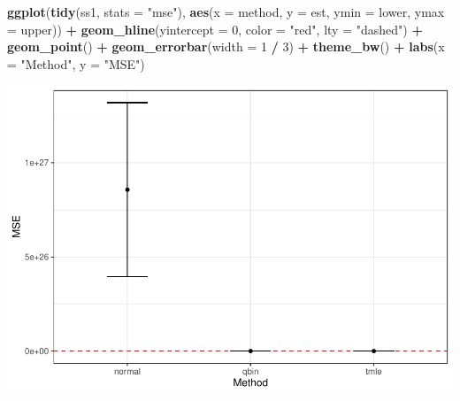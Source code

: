 \documentclass[
]{article}
\newenvironment{Shaded}{\begin{snugshade}}{\end{snugshade}}
\newcommand{\AttributeTok}[1]{\textcolor[rgb]{0.13,0.29,0.53}{#1}}
\newcommand{\DecValTok}[1]{\textcolor[rgb]{0.00,0.00,0.81}{#1}}
\newcommand{\FunctionTok}[1]{\textcolor[rgb]{0.13,0.29,0.53}{\textbf{#1}}}
\newcommand{\NormalTok}[1]{#1}
\newcommand{\SpecialCharTok}[1]{\textcolor[rgb]{0.81,0.36,0.00}{\textbf{#1}}}
\newcommand{\StringTok}[1]{\textcolor[rgb]{0.31,0.60,0.02}{#1}}
\begin{document}
\begin{Shaded}
\begin{Highlighting}[]
\FunctionTok{ggplot}\NormalTok{(}\FunctionTok{tidy}\NormalTok{(ss1, }\AttributeTok{stats =} \StringTok{"mse"}\NormalTok{), }\FunctionTok{aes}\NormalTok{(}\AttributeTok{x =}\NormalTok{ method, }\AttributeTok{y =}\NormalTok{ est, }\AttributeTok{ymin =}\NormalTok{ lower, }\AttributeTok{ymax =}\NormalTok{ upper)) }\SpecialCharTok{+}
  \FunctionTok{geom\_hline}\NormalTok{(}\AttributeTok{yintercept =} \DecValTok{0}\NormalTok{, }\AttributeTok{color =} \StringTok{"red"}\NormalTok{, }\AttributeTok{lty =} \StringTok{"dashed"}\NormalTok{) }\SpecialCharTok{+}
  \FunctionTok{geom\_point}\NormalTok{() }\SpecialCharTok{+}
  \FunctionTok{geom\_errorbar}\NormalTok{(}\AttributeTok{width =} \DecValTok{1} \SpecialCharTok{/} \DecValTok{3}\NormalTok{) }\SpecialCharTok{+}
  \FunctionTok{theme\_bw}\NormalTok{() }\SpecialCharTok{+}
  \FunctionTok{labs}\NormalTok{(}\AttributeTok{x =} \StringTok{"Method"}\NormalTok{, }\AttributeTok{y =} \StringTok{"MSE"}\NormalTok{)}
\end{Highlighting}
\end{Shaded}

\includegraphics{simulation_files/figure-latex/sim-results-2.pdf}
\end{document}
